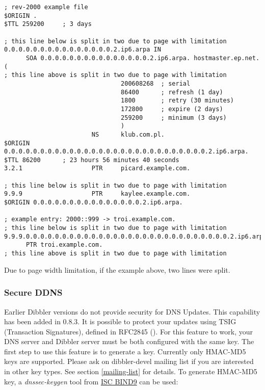 \begin{lstlisting}
; rev-2000 example file
$ORIGIN .
$TTL 259200     ; 3 days

; this line below is split in two due to page with limitation
0.0.0.0.0.0.0.0.0.0.0.0.0.0.0.2.ip6.arpa IN
      SOA 0.0.0.0.0.0.0.0.0.0.0.0.0.0.0.2.ip6.arpa. hostmaster.ep.net. (
; this line above is split in two due to page with limitation
                                200608268  ; serial
                                86400      ; refresh (1 day)
                                1800       ; retry (30 minutes)
                                172800     ; expire (2 days)
                                259200     ; minimum (3 days)
                                )
                        NS      klub.com.pl.
$ORIGIN 0.0.0.0.0.0.0.0.0.0.0.0.0.0.0.0.0.0.0.0.0.0.0.0.0.0.0.0.2.ip6.arpa.
$TTL 86200      ; 23 hours 56 minutes 40 seconds
3.2.1                   PTR     picard.example.com.

; this line below is split in two due to page with limitation
9.9.9                   PTR     kaylee.example.com.
$ORIGIN 0.0.0.0.0.0.0.0.0.0.0.0.0.0.0.2.ip6.arpa.

; example entry: 2000::999 -> troi.example.com.
; this line below is split in two due to page with limitation
9.9.9.0.0.0.0.0.0.0.0.0.0.0.0.0.0.0.0.0.0.0.0.0.0.0.0.0.0.0.0.2.ip6.arpa
      PTR troi.example.com.
; this line above is split in two due to page with limitation
\end{lstlisting}
\Note Due to page width limitation, if the example above, two lines were
split.

\subsubsection{Secure DDNS}

Earlier Dibbler versions do not provide security for DNS Updates. This
capability has been added in 0.8.3. It is possible to protect your
updates using TSIG (Transaction Signatures), defined in RFC2845
(\cite{rfc2845}). For this feature to work, your DNS server and
Dibbler server must be both configured with the same key. The first
step to use this feature is to generate a key. Currently only HMAC-MD5
keys are supported. Please ask on dibbler-devel mailing list if you
are interested in other key types. See section \ref{mailing-list} for
details. To generate HMAC-MD5 key, a \emph{dnssec-keygen} tool from
\href{http://www.isc.org/software/bind}{ISC BIND9} can be used:

